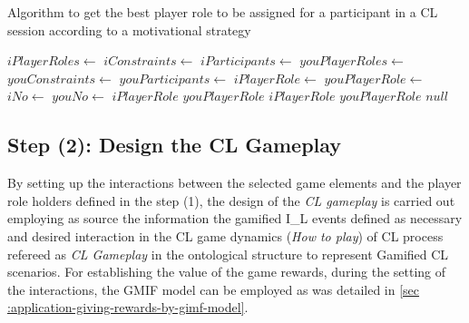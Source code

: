\begin{algoritmo}
\caption{Algorithm to get the best player role to be assigned for a participant  in a CL session  according to a motivational strategy }
\label{algorithm:get-best-player-role}
\begin{algorithmic}[1]\small
{}
  \State $iPlayerRoles \gets$ 
  \State $iConstraints \gets$ 
  \State $iParticipants \gets$ 
  \State $youPlayerRoles \gets$ 
  \State $youConstraints \gets$ 
  \State $youParticipants \gets$ 
    \State \Return {}
    \State \Return {}
    \State $iPlayerRole \gets$ 
    \State $youPlayerRole \gets$ 
      \State $iNo \gets$ 
      \State $youNo \gets$ 
       \Return $iPlayerRole$
       \Return $youPlayerRole$
      \EndIf
     \Return $iPlayerRole$
     \Return $youPlayerRole$
    \EndIf
  \EndIf
  \State \Return $null$
\EndFunction
\end{algorithmic}
\end{algoritmo}


\subsection*{Step (2): Design the CL Gameplay}

By setting up the interactions between the selected game elements and the player role holders defined in the step (1),
the design of the \emph{CL gameplay} is carried out employing as source the information the gamified I\_L events defined
as necessary and desired interaction in the CL game dynamics (\emph{How to play}) of CL process refereed as \emph{CL
Gameplay} in the ontological structure to represent Gamified CL scenarios. For establishing the value of the game
rewards, during the setting of the interactions, the GMIF model can be employed as was detailed in \autoref{sec
:application-giving-rewards-by-gimf-model}.

